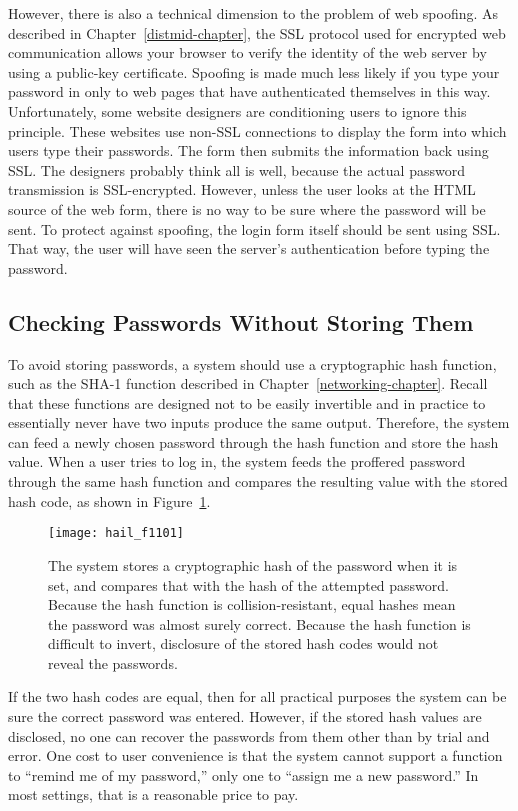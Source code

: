 However, there is also a technical dimension to the problem of web
spoofing.  As described in Chapter~\ref{distmid-chapter}, the SSL
protocol used for encrypted web communication allows your browser to
verify the identity of the web server by using a public-key
certificate.  Spoofing is made much less likely if you type your
password in only to web pages that have authenticated themselves in this
way.  Unfortunately, some website designers are conditioning users to
ignore this principle.  These websites use non-SSL connections to
display the form into which users type their passwords.  The form then
submits the information back using SSL.  The designers probably think
all is well, because the actual password transmission is
SSL-encrypted.  However, unless the user looks at the HTML
source of the web form, there is no way to be sure where the password
will be sent.  To protect against spoofing, the login form itself
should be sent using SSL.  That way, the user will have seen the
server's authentication before typing the password.

\subsection{Checking Passwords Without Storing Them}

To avoid storing passwords, a system should use a cryptographic hash
function, such as the SHA-1 function described in
Chapter~\ref{networking-chapter}.  Recall that these functions are
designed not to be easily invertible and in practice to essentially
never have two inputs produce the same output.  Therefore, the system
can feed a newly chosen password through the hash function and store
the hash value.  When a user tries to log in, the system feeds the
proffered password through the same hash function and compares the
resulting value with the stored hash code, as shown in
Figure~\ref{scan-11-1}.
\begin{figure}
\centerline{\texttt{[image: hail\_f1101]}}
\caption{The system stores a
  cryptographic hash of the password when it is set, and compares that
  with the hash of the attempted password.  Because the hash function
  is collision-resistant, equal hashes mean the password was almost
  surely correct.  Because the hash function is difficult to invert,
  disclosure of the stored hash codes would not reveal the passwords.}
\label{scan-11-1}
\end{figure}
If the two hash codes are equal, then
for all practical purposes the system can be sure the correct password
was entered. However, if the stored hash values are disclosed, no one can
recover the passwords from them other than by trial and error.  One cost to user convenience is that the
system cannot support a function to ``remind me of my password,'' only
one to ``assign me a new password.''  In most settings, that is a
reasonable price to pay.

